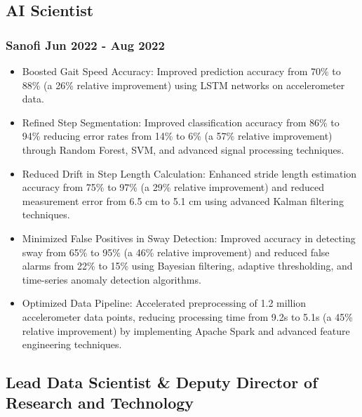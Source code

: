 \documentclass[11pt]{article} %
\begin{document}
\subsection{AI Scientist}
\subsubsection{Sanofi \hfill Jun 2022 - Aug 2022}
\begin{itemize}
	\item Boosted Gait Speed Accuracy: Improved prediction accuracy from 70\% to 88\% (a 26\% relative improvement) using LSTM networks on accelerometer data.
	\item Refined Step Segmentation: Improved classification accuracy from 86\% to 94\% reducing error rates from 14\% to 6\% (a 57\% relative improvement) through Random Forest, SVM, and advanced signal processing techniques.
	\item Reduced Drift in Step Length Calculation: Enhanced stride length estimation accuracy from 75\% to 97\% (a 29\% relative improvement) and reduced measurement error from 6.5 cm to 5.1 cm using advanced Kalman filtering techniques.
	\item Minimized False Positives in Sway Detection: Improved accuracy in detecting sway from 65\% to 95\% (a 46\% relative improvement) and reduced false alarms from 22\% to 15\% using Bayesian filtering, adaptive thresholding, and time-series anomaly detection algorithms.
	\item Optimized Data Pipeline: Accelerated preprocessing of 1.2 million accelerometer data points, reducing processing time from 9.2s to 5.1s (a 45\% relative improvement) by implementing Apache Spark and advanced feature engineering techniques.
\end{itemize}

\subsection{Lead Data Scientist \& Deputy Director of Research and Technology}
\end{document}
